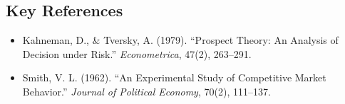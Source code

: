 \subsection*{Key References}
\begin{itemize}
    \item Kahneman, D., \& Tversky, A. (1979). ``Prospect Theory: An Analysis of Decision under Risk.'' \textit{Econometrica}, 47(2), 263--291.
    \item Smith, V. L. (1962). ``An Experimental Study of Competitive Market Behavior.'' \textit{Journal of Political Economy}, 70(2), 111--137.
\end{itemize}
